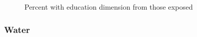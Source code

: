 \documentclass[
  letterpaper,
  DIV=11,
  numbers=noendperiod]{scrartcl}
\begin{document}
\begin{figure}[H]


\caption{\label{fig-education}Percent with education dimension from
those exposed}

\end{figure}%

\subsubsection{Water}\label{water}
\end{document}
